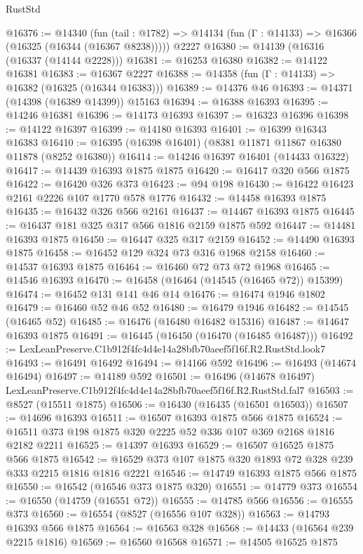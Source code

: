 \begin{lexlean}{RustStd}
\begin{coremodule}
@16376 := @14340
    (fun (tail : @1782) => @14134 (fun (Γ : @14133) => @16366 (@16325 (@16344 (@16367 @8238)))))
    @2227
@16380 := @14139 (@16316 (@16337 (@14144 @2228)))
@16381 := @16253 @16380
@16382 := @14122 @16381
@16383 := @16367 @2227
@16388 := @14358 (fun (Γ : @14133) => @16382 (@16325 (@16344 @16383)))
@16389 := @14376 @46
@16393 := @14371 (@14398 (@16389 @14399)) @15163
@16394 := @16388 @16393
@16395 := @14246 @16381
@16396 := @14173 @16393
@16397 := @16323 @16396
@16398 := @14122 @16397
@16399 := @14180 @16393
@16401 := @16399 @16343 @16383
@16410 := @16395 (@16398 @16401) (@8381 @11871 @11867 @16380 @11878 (@8252 @16380))
@16414 := @14246 @16397 @16401 (@14433 @16322)
@16417 := @14439 @16393 @1875 @1875
@16420 := @16417 @320 @566 @1875
@16422 := @16420 @326 @373
@16423 := @94 @198
@16430 := @16422 @16423 @2161 @2226 @107 @1770 @578 @1776
@16432 := @14458 @16393 @1875
@16435 := @16432 @326 @566 @2161
@16437 := @14467 @16393 @1875
@16445 := @16437 @181 @325 @317 @566 @1816 @2159 @1875 @592
@16447 := @14481 @16393 @1875
@16450 := @16447 @325 @317 @2159
@16452 := @14490 @16393 @1875
@16458 := @16452 @129 @324 @73 @316 @1968 @2158
@16460 := @14537 @16393 @1875
@16464 := @16460 @72 @73 @72 @1968
@16465 := @14546 @16393
@16470 := @16458 (@16464 (@14545 (@16465 @72)) @15399)
@16474 := @16452 @131 @141 @46 @14
@16476 := @16474 @1946 @1802
@16479 := @16460 @52 @46 @52
@16480 := @16479 @1946
@16482 := @14545 (@16465 @52)
@16485 := @16476 (@16480 @16482 @15316)
@16487 := @14647 @16393 @1875
@16491 := @16445 (@16450 (@16470 (@16485 @16487)))
@16492 := LexLeanPreserve.C1b912f4fc4d4e14a28bfb70aeef5f16f.R2.RustStd.look7
@16493 := @16491 @16492
@16494 := @14166 @592
@16496 := @16493 (@14674 @16494)
@16497 := @14189 @592
@16501 := @16496 (@14678 @16497) LexLeanPreserve.C1b912f4fc4d4e14a28bfb70aeef5f16f.R2.RustStd.fal7
@16503 := @8527 (@15511 @1875)
@16506 := @16430 (@16435 (@16501 @16503))
@16507 := @14696 @16393
@16511 := @16507 @16393 @1875 @566 @1875
@16524 := @16511 @373 @198 @1875 @320 @2225 @52 @336 @107 @369 @2168 @1816 @2182 @2211
@16525 := @14397 @16393
@16529 := @16507 @16525 @1875 @566 @1875
@16542 := @16529 @373 @107 @1875 @320 @1893 @72 @328 @239 @333 @2215 @1816 @1816 @2221
@16546 := @14749 @16393 @1875 @566 @1875
@16550 := @16542 (@16546 @373 @1875 @320)
@16551 := @14779 @373
@16554 := @16550 (@14759 (@16551 @72))
@16555 := @14785 @566
@16556 := @16555 @373
@16560 := @16554 (@8527 (@16556 @107 @328))
@16563 := @14793 @16393 @566 @1875
@16564 := @16563 @328
@16568 := @14433 (@16564 @239 @2215 @1816)
@16569 := @16560 @16568
@16571 := @14505 @16525 @1875

\end{coremodule}
\end{lexlean}
